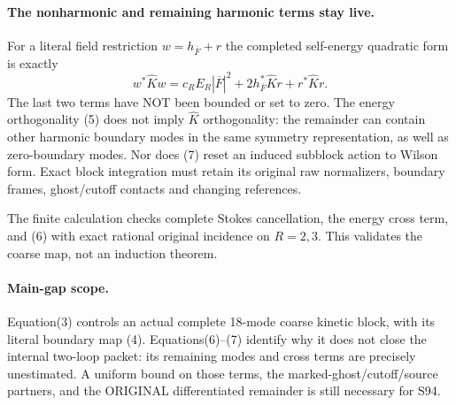 \documentclass[11pt]{article}
\begin{document}
\paragraph{The nonharmonic and remaining harmonic terms stay live.}
For a literal field restriction $w=h_{\overline F}+r$ the completed
self-energy quadratic form is exactly
\[
 w^*\widehat K w
 =c_R E_R|\overline F|^2
       +2h_{\overline F}^*\widehat K r+r^*\widehat K r.            \tag{7}
\]
The last two terms have NOT been bounded or set to zero. The energy
orthogonality (5) does not imply $\widehat K$ orthogonality: the
remainder can contain other harmonic boundary modes in the same
symmetry representation, as well as zero-boundary modes. Nor does
(7) reset an induced subblock action to Wilson form.
Exact block integration must retain its original raw normalizers,
boundary frames, ghost/cutoff contacts and changing references.

The finite calculation
checks complete Stokes cancellation, the energy cross term, and
(6) with exact rational original incidence on $R=2,3$.
This validates the coarse map, not an induction theorem.

\paragraph{Main-gap scope.}
Equation(3) controls an actual complete 18-mode coarse kinetic block,
with its literal boundary map (4). Equations(6)--(7) identify why it
does not close the internal two-loop packet: its remaining modes and
cross terms are precisely unestimated. A uniform bound on those
terms, the marked-ghost/cutoff/source partners, and the ORIGINAL
differentiated remainder is still necessary for S94.
\end{document}
